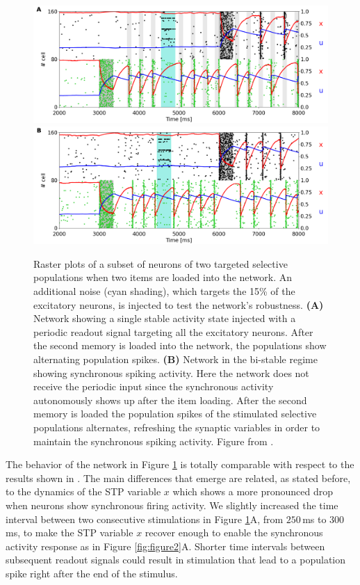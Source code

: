 \documentclass[a4paper, 12pt, twoside, openright]{book}
\begin{document}
\begin{figure}[H]
    \centering
    \includegraphics[width=0.9\columnwidth]{figures/fig3A.png}
    \includegraphics[width=0.9\columnwidth]{figures/fig3B.png}
    \caption{Raster plots of a subset of neurons of two targeted selective populations when two items are loaded into the network. An additional noise (cyan shading), which targets the 15\% of the excitatory neurons, is injected to test the network's robustness. \textbf{(A)} Network showing a single stable activity state injected with a periodic readout signal targeting all the excitatory neurons. After the second memory is loaded into the network, the populations show alternating population spikes. \textbf{(B)} Network in the bi-stable regime showing synchronous spiking activity. Here the network does not receive the periodic input since the synchronous activity autonomously shows up after the item loading. After the second memory is loaded the population spikes of the stimulated selective populations alternates, refreshing the synaptic variables in order to maintain the synchronous spiking activity. Figure from \cite{Tiddia2022_WM}.}
    \label{fig:figure3}
\end{figure}


The behavior of the network in Figure \ref{fig:figure3} is totally comparable with respect to the results shown in \cite{Mongillo2008}. The main differences that emerge are related, as stated before, to the dynamics of the STP variable $x$ which shows a more pronounced drop when neurons show synchronous firing activity. We slightly increased the time interval between two consecutive stimulations in Figure \ref{fig:figure3}A, from $250$\,ms to $300$\,ms, to make the STP variable $x$ recover enough to enable the synchronous activity response as in Figure \ref{fig:figure2}A. Shorter time intervals between subsequent readout signals could result in stimulation that lead to a population spike right after the end of the stimulus.
\end{document}
